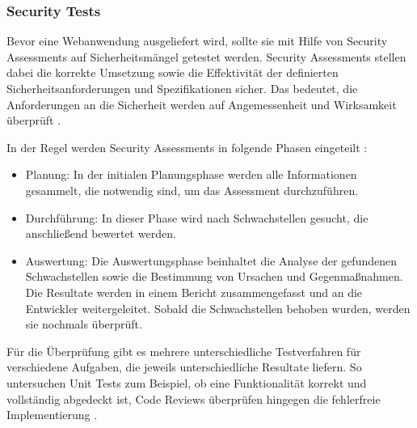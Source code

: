 \documentclass[12pt,oneside,a4paper,parskip,pointlessnumbers]{scrbook}
\begin{document}
  \subsubsection{Security Tests}

  Bevor eine Webanwendung ausgeliefert wird, sollte sie mit Hilfe von Security Assessments  auf Sicherheitsmängel getestet werden.
Security Assessments stellen dabei die korrekte Umsetzung sowie die Effektivität der definierten Sicherheitsanforderungen und Spezifikationen sicher. Das bedeutet, die Anforderungen an die Sicherheit werden auf Angemessenheit und Wirksamkeit überprüft \cite{BSI}.

  In der Regel werden Security Assessments in folgende Phasen eingeteilt \cite{BSI}:
  \begin{itemize}
    \item Planung: In der initialen Planungsphase werden alle Informationen gesammelt, die notwendig sind, um das Assessment durchzuführen.
    \item Durchführung: In dieser Phase wird nach Schwachstellen gesucht, die anschließend bewertet werden.
    \item Auswertung: Die Auswertungsphase beinhaltet die Analyse der gefundenen Schwachstellen sowie die Bestimmung von Ursachen und Gegenmaßnahmen. Die Resultate werden in einem Bericht zusammengefasst und an die Entwickler weitergeleitet. Sobald die Schwachstellen behoben wurden, werden sie nochmals überprüft.
  \end{itemize}
  Für die Überprüfung gibt es mehrere unterschiedliche Testverfahren für verschiedene Aufgaben, die jeweils unterschiedliche Resultate liefern. So untersuchen Unit Tests zum Beispiel, ob eine Funktionalität korrekt und vollständig abgedeckt ist, Code Reviews überprüfen hingegen die fehlerfreie Implementierung \cite{BSI}.
\end{document}
